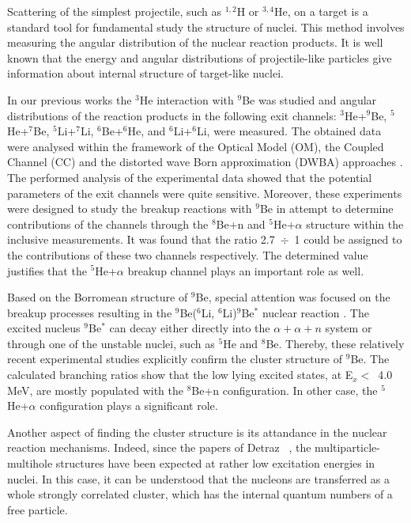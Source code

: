 \documentclass[10pt]{iopart}
\begin{document}
	Scattering of the simplest projectile, such as $^{1,2}$H or $^{3,4}$He, on a target is a standard tool for fundamental study the structure of nuclei. 
	This method involves measuring the angular distribution of the nuclear reaction products.
	It is well known that the energy and angular distributions of projectile-like particles give information about internal structure of target-like nuclei.
	
	In our previous works \cite{lukyanov2014, lukyanov2015, janseitov2018} the $^3$He interaction with $^9$Be was studied and angular distributions of the reaction products in the following exit channels: $^3$He+$^9$Be, $^5$He+$^7$Be, $^5$Li+$^7$Li, $^6$Be+$^6$He, and $^6$Li+$^6$Li, were measured. The obtained data were analysed within the framework of the Optical Model (OM), the Coupled Channel (CC) and the distorted wave Born approximation (DWBA) approaches  . 
	The performed analysis of the experimental data showed that the potential parameters of the exit channels were quite sensitive.
	Moreover, these experiments were designed to study the breakup reactions with $^9$Be in attempt to determine contributions of the channels through the $^8$Be+n  and  $^5$He+$\alpha$ structure within the inclusive measurements.
	It was found that the ratio 2.7~$\div$~1 could be assigned to the contributions of these two channels respectively. The determined value justifies that the $^5$He+$\alpha$ breakup channel plays an important role as well. 

Based on the Borromean structure of $^9$Be, special attention was focused on the breakup processes resulting in the $^9$Be($^6$Li, $^6$Li)$^9$Be$^*$ nuclear reaction \cite{brown2007, papka2007}. The excited nucleus $^9$Be$^*$ can decay either directly into the $\alpha+\alpha+n$ system or through one of the unstable nuclei, such as $^5$He and $^8$Be. Thereby, these relatively recent experimental studies explicitly confirm the cluster structure of $^9$Be. 
The calculated branching ratios  show that the low lying excited states, at E$_x <$~4.0 MeV,  are mostly populated with the $^8$Be+n configuration. In other case, the $^5$He+$\alpha$ configuration plays a significant  role.

Another aspect of finding the cluster structure is its attandance in the nuclear reaction mechanisms. Indeed, since the papers of Detraz \etal~\cite{detraz1970, detraz1974}, the multiparticle-multihole structures have been expected at rather low excitation energies in nuclei. In this case, it can be understood that the nucleons are transferred as a whole strongly correlated cluster, which has the internal quantum numbers of a free particle.
\end{document}
